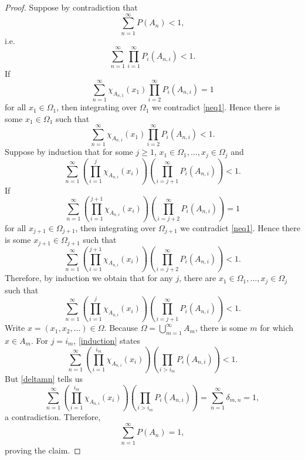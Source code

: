 \documentclass{article}
\theoremstyle{definition}
\theoremstyle{definition}
\begin{document}
\begin{proof}
Suppose by contradiction that
\[
\sum_{n=1}^\infty P(A_n) < 1,
\]
i.e.
\begin{equation}
\sum_{n=1}^\infty \prod_{i=1}^{\infty} P_i(A_{n,i})<1.
\label{neq1}
\end{equation}
If 
\[
\sum_{n=1}^\infty \chi_{A_{n,1}}(x_1) \prod_{i=2}^{\infty} P_i(A_{n,i}) = 1
\]
for all $x_1 \in \Omega_1$, then integrating over $\Omega_1$ we contradict \eqref{neq1}. Hence
there is some $x_1 \in \Omega_1$ such that
\[
\sum_{n=1}^\infty \chi_{A_{n,1}}(x_1) \prod_{i=2}^{\infty} P_i(A_{n,i}) <1.
\]
Suppose by induction that for some $j \geq 1$, $x_1 \in \Omega_1,\ldots,x_j \in \Omega_j$ and 
\[
\sum_{n=1}^\infty \left( \prod_{i=1}^j \chi_{A_{n,i}}(x_i) \right) \left(\prod_{i=j+1}^{\infty} P_i(A_{n,i})\right) <1.
\]
If
\[
\sum_{n=1}^\infty \left( \prod_{i=1}^{j+1} \chi_{A_{n,i}}(x_i) \right) \left(\prod_{i=j+2}^{\infty} P_i(A_{n,i})\right) =1
\]
for all $x_{j+1} \in \Omega_{j+1}$, then integrating over $\Omega_{j+1}$ we contradict
\eqref{neq1}. Hence there is some $x_{j+1} \in \Omega_{j+1}$ such that
\[
\sum_{n=1}^\infty \left( \prod_{i=1}^{j+1} \chi_{A_{n,i}}(x_i) \right) \left(\prod_{i=j+2}^{\infty} P_i(A_{n,i})\right) <1.
\]
Therefore, by induction we obtain that for any $j$, there are $x_1 \in \Omega_1,\ldots,x_j \in \Omega_j$ such that
\begin{equation}
\sum_{n=1}^\infty \left( \prod_{i=1}^j \chi_{A_{n,i}}(x_i) \right) \left(\prod_{i=j+1}^{\infty} P_i(A_{n,i})\right) <1.
\label{induction}
\end{equation}
Write $x=(x_1,x_2,\ldots) \in \Omega$. Because $\Omega= \bigcup_{m=1}^\infty A_m$, there is some $m$ for which
$x \in A_m$. For $j=i_m$, \eqref{induction} states
\[
\sum_{n=1}^\infty \left( \prod_{i=1}^{i_m} \chi_{A_{n,i}}(x_i) \right) \left(\prod_{i>i_m} P_i(A_{n,i})\right) <1.
\]
But \eqref{deltamn} tells us
\[
\sum_{n=1}^\infty \left( \prod_{i=1}^{i_m} \chi_{A_{n,i}}(x_i) \right)  \left( \prod_{i>i_m} P_i(A_{n,i}) \right)=
\sum_{n=1}^\infty \delta_{m,n} =1,
\]
a contradiction. Therefore, 
\[
\sum_{n=1}^\infty P(A_n) =1,
\]
proving the claim.
\end{proof}
\end{document}
